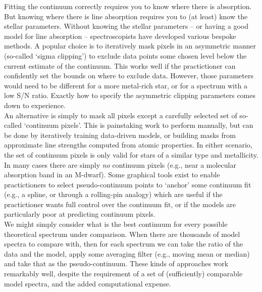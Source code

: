 \documentclass[modern]{aastex631}
\begin{document}
Fitting the continuum correctly requires you to know where there is absorption. But knowing where there is line absorption requires you to (at least) know the stellar parameters. Without knowing the stellar parameters -- or having a good model for line absorption -- spectroscopists have developed various bespoke methods. A popular choice is to iteratively mask pixels in an asymmetric manner (so-called `sigma clipping') to exclude data points some chosen level below the current estimate of the continuum. This works well if the practictioner can confidently set the bounds on where to exclude data. However, those parameters would need to be different for a more metal-rich star, or for a spectrum with a low S/N ratio. Exactly how to specify the asymmetric clipping parameters comes down to experience.\\

An alternative is simply to mask all pixels except a carefully selected set of so-called `continuum pixels'. This is painstaking work to perform manually, but can be done by iteratively training data-driven models, or building masks from approximate line strengths computed from atomic properties. In either scenario, the set of continuum pixels is only valid for stars of a similar type and metallicity. In many cases there are simply \emph{no} continuum pixels (e.g., near a molecular absorption band in an M-dwarf). Some graphical tools exist to enable practictioners to select pseudo-continuum points to `anchor' some continuum fit (e.g., a spline, or through a rolling-pin analogy) which are useful if the practictioner wants full control over the continuum fit, or if the models are particularly poor at predicting continuum pixels.\\

We might simply consider what is the best continuum for every possible theoretical spectrum under comparison. When there are thousands of model spectra to compare with, then for each spectrum we can take the ratio of the data and the model, apply some averaging filter (e.g., moving mean or median) and take that as the pseudo-continuum. These kinds of approaches work remarkably well, despite the requirement of a set of (sufficiently) comparable model spectra, and the added computational expense.\\
\end{document}
